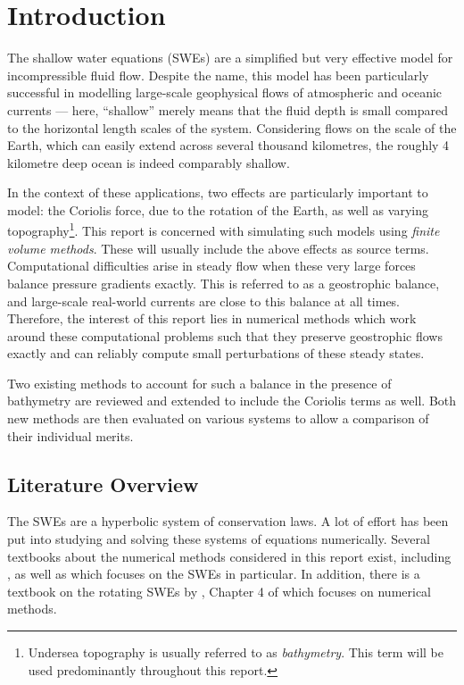 \chapter{Introduction}
\label{ch:introduction}

The shallow water equations (SWEs) are a simplified but very effective model for incompressible fluid flow. Despite the name, this model has been particularly successful in modelling large-scale geophysical flows of atmospheric and oceanic currents --- here, ``shallow'' merely means that the fluid depth is small compared to the horizontal length scales of the system. Considering flows on the scale of the Earth, which can easily extend across several thousand kilometres, the roughly 4 kilometre deep ocean is indeed comparably shallow.

In the context of these applications, two effects are particularly important to model: the Coriolis force, due to the rotation of the Earth, as well as varying topography\footnote{Undersea topography is usually referred to as \emph{bathymetry}. This term will be used predominantly throughout this report.}. This report is concerned with simulating such models using \emph{finite volume methods}. These will usually include the above effects as source terms. Computational difficulties arise in steady flow when these very large forces balance pressure gradients exactly. This is referred to as a geostrophic balance, and large-scale real-world currents are close to this balance at all times. Therefore, the interest of this report lies in numerical methods which work around these computational problems such that they preserve geostrophic flows exactly and can reliably compute small perturbations of these steady states.

Two existing methods to account for such a balance in the presence of bathymetry are reviewed and extended to include the Coriolis terms as well. Both new methods are then evaluated on various systems to allow a comparison of their individual merits.

\section{Literature Overview}

The SWEs are a hyperbolic system of conservation laws. A lot of effort has been put into studying and solving these systems of equations numerically. Several textbooks about the numerical methods considered in this report exist, including \cite{leveque1992numerical,toro1999riemann,leveque2002finite}, as well as \cite{toro2001shock} which focuses on the SWEs in particular. In addition, there is a textbook on the rotating SWEs by \citet{zeitlin2007nonlinear}, Chapter 4 of which focuses on numerical methods.

